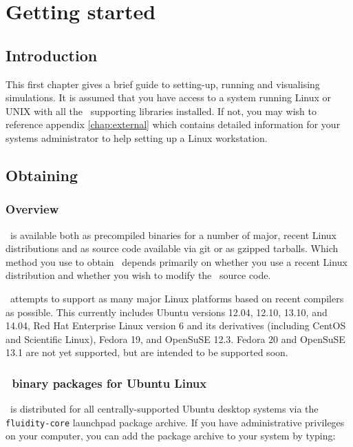 \chapter{Getting started}\label{chap:gettingstarted}

\section{Introduction} This first chapter gives a brief guide to setting-up,
running and visualising simulations. It is assumed that you have access to a
system running Linux or UNIX with all the \fluidity\ supporting libraries
installed. If not, you may wish to reference appendix \ref{chap:external} which
contains detailed information for your systems administrator to help setting up
a Linux workstation.

\section{Obtaining \fluidity}
\label{sec:obtaining_fluidity}

\subsection{Overview}
\label{sec:obtaining_fluidity_overview}

\fluidity\ is available both as precompiled binaries for a number of major,
recent Linux distributions and as source code available via git or as gzipped
tarballs. Which method you use to obtain \fluidity\ depends primarily on
whether you use a recent Linux distribution and whether you wish to modify the
\fluidity\ source code.

\fluidity\ attempts to support as many major Linux platforms based on recent
compilers as possible. This currently includes Ubuntu versions 12.04, 12.10,
13.10, and 14.04, Red Hat Enterprise Linux version 6 and its derivatives
(including CentOS and Scientific Linux), Fedora 19, and OpenSuSE 12.3. Fedora
20 and OpenSuSE 13.1 are not yet supported, but are intended to be supported
soon.

\subsection{\fluidity\ binary packages for Ubuntu Linux}

\fluidity\ is distributed for all centrally-supported Ubuntu desktop systems
via the \lstinline[language=Bash]+fluidity-core+ launchpad package archive. If
you have administrative privileges on your computer, you can add the package
archive to your system by typing:


